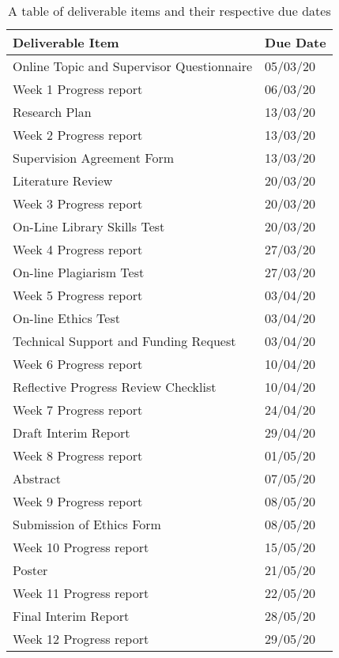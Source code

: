 \begin{table}[h]
	\centering
	\caption{A table of deliverable items and their respective due dates}
	\begin{tabular}{ll}
		\toprule
		Deliverable Item 						  & Due Date \\
		\midrule
		Online Topic and Supervisor Questionnaire & 05/03/20 \\
		Week 1 Progress report					  & 06/03/20 \\
		Research Plan 							  & 13/03/20\\
		Week 2 Progress report 					  & 13/03/20 \\
		Supervision Agreement Form 				  & 13/03/20 \\
		Literature Review 						  & 20/03/20 \\
		Week 3 Progress report 					  & 20/03/20 \\
		On-Line Library Skills Test				  & 20/03/20 \\
		Week 4 Progress report					  & 27/03/20 \\
		On-line Plagiarism Test					  & 27/03/20 \\
		Week 5 Progress report 					  & 03/04/20 \\
		On-line Ethics Test						  & 03/04/20 \\
		Technical Support and Funding Request 	  & 03/04/20 \\
		Week 6 Progress report 					  & 10/04/20 \\
		Reflective Progress Review Checklist 	  & 10/04/20 \\
		Week 7 Progress report 					  & 24/04/20 \\
		Draft Interim Report 					  & 29/04/20 \\
		Week 8 Progress report 					  & 01/05/20 \\
		Abstract 								  & 07/05/20 \\
		Week 9 Progress report 					  & 08/05/20 \\
		Submission of Ethics Form 				  & 08/05/20 \\
		Week 10 Progress report					  & 15/05/20 \\
		Poster 									  & 21/05/20 \\
		Week 11 Progress report					  & 22/05/20 \\
		Final Interim Report 					  & 28/05/20 \\
		Week 12 Progress report					  & 29/05/20 \\
		\bottomrule
	\end{tabular}
	\label{tab:deliverables}
\end{table}